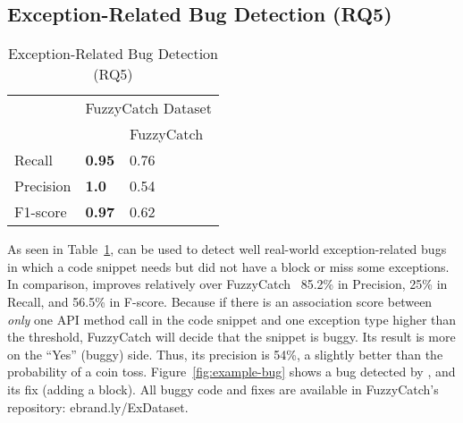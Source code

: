 \subsection{Exception-Related Bug Detection (RQ5)}
\label{sec:rq1}

\begin{table}[t]%
  \caption {Exception-Related Bug Detection (RQ5)}
  \vspace{-12pt}
  \small
	\begin{center}
		\renewcommand{\arraystretch}{1}
		\begin{tabular}{|p{1.75cm}<{\centering}|p{1.75cm}<{\centering}|p{1.75cm}<{\centering}|}
		  \hline
			\multirow{2}{*}{} & \multicolumn{2}{c|}{FuzzyCatch Dataset} \\
			\cline{2-3}
			  & \tool  & FuzzyCatch~\cite{xrank-fse20} \\
			\hline
			Recall    & \textbf{0.95}& 0.76\\
			Precision & \textbf{1.0} & 0.54\\
			F1-score   & \textbf{0.97} & 0.62\\
			\hline
		\end{tabular}
		\label{tab:bug}
	\end{center}
\end{table}



As seen in Table~\ref{tab:bug}, {\tool} can be used to detect well
real-world exception-related bugs in which a code snippet needs but
did not have a  block or miss some exceptions. In
comparison, {\tool} improves relatively over
FuzzyCatch~\cite{xrank-fse20} 85.2\% in Precision, 25\% in Recall, and
56.5\% in F-score.
Because if there is an association score between {\em only} one API
method call in the code snippet and one exception type higher than the
threshold, FuzzyCatch will decide that the snippet is buggy. Its
result is more on the ``Yes'' (buggy) side. Thus, its precision is
54\%, a slightly better than the probability of a coin
toss. Figure~\ref{fig:example-bug} shows a bug detected by {\tool},
and its fix (adding a  block). All buggy code and
fixes are available in FuzzyCatch's repository: ebrand.ly/ExDataset.




